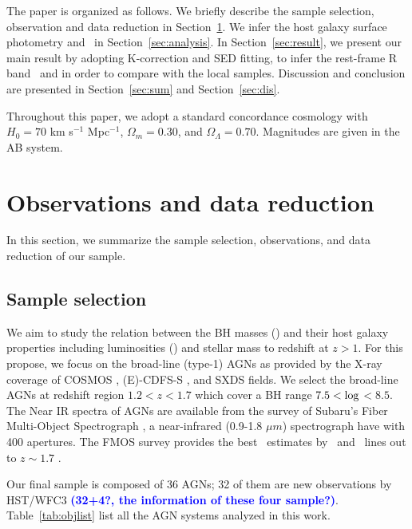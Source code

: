 \documentclass[apj]{emulateapj}
\begin{document}
The paper is organized as follows. We briefly describe the sample selection, observation and data reduction in Section~\ref{sec:data}. We infer the host galaxy surface photometry and \mbh\ in Section~\ref{sec:analysis}. In Section~\ref{sec:result}, we present our main result by adopting K-correction and SED fitting, to infer the rest-frame R band \lhost\ and \smass in order to compare with the local samples. Discussion and conclusion are presented in Section~\ref{sec:sum} and Section~\ref{sec:dis}. 

Throughout this paper, we adopt a standard concordance cosmology with $H_0= 70$ km s$^{-1}$ Mpc$^{-1}$, $\Omega{_m} = 0.30$, and $\Omega{_\Lambda} =
0.70$. Magnitudes are given in the AB system.

\section{Observations and data reduction}
\label{sec:data}
In this section, we summarize the sample selection, observations, and data reduction of our sample. 

\subsection{Sample selection}

We aim to study the relation between the BH masses (\mbh) and their host galaxy properties including luminosities (\lhost) and stellar mass to redshift at $z>1$. For this propose, we focus on the broad-line (type-1) AGNs as provided by the X-ray coverage of COSMOS \citep{Civano2016}, (E)-CDFS-S \citep{Lehmer2005, Xue2011}, and SXDS \citep{Ueda2008} fields. We select the broad-line AGNs at redshift region $1.2<z<1.7$ which cover a BH range $7.5<{\rm log}$\mbh $<8.5$. The Near IR spectra of AGNs are available from the survey of Subaru's Fiber Multi-Object Spectrograph \citep[FMOS, ][]{Kimura2010, Schulze2018}, a near-infrared (0.9-1.8 $\mu m$) spectrograph have with 400 apertures. The FMOS survey provides the best \mbh\ estimates by \halpha\ and \hbeta\ lines out to $z\sim1.7$ \citep{Greene2005, Matsuoka2013, Nobuta2012}.

Our final sample is composed of 36  AGNs; 32 of them are new observations by HST/WFC3 \textcolor{blue}{\bf (32+4?, the information of these four sample?)}. Table~\ref{tab:objlist} list all the AGN systems analyzed in this work.
\end{document}
